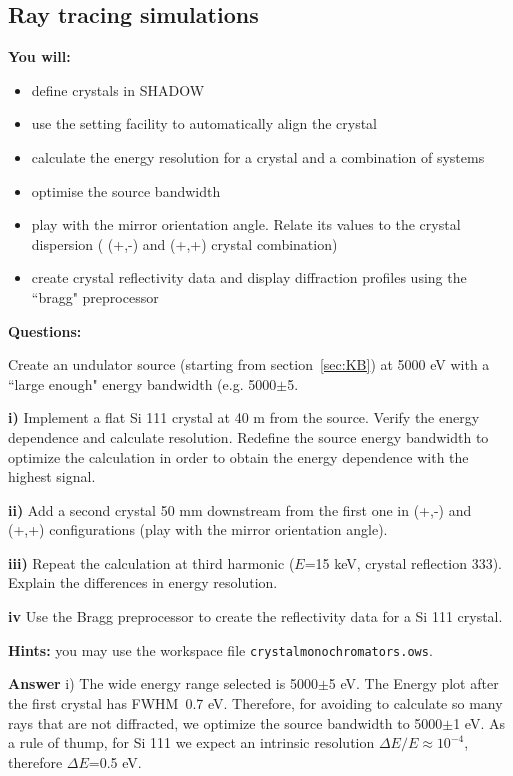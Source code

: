 \subsection{Ray tracing simulations}

\textbf{You will:}

\begin{itemize}
    \item define crystals in SHADOW
    \item use the setting facility to automatically align the crystal
    \item calculate the energy resolution for a crystal and a combination of systems
    \item optimise the source bandwidth
    \item play with the mirror orientation angle. Relate its values to the crystal dispersion ( (+,-) and (+,+) crystal combination)
    \item create crystal reflectivity data and display diffraction profiles using the ``bragg" preprocessor
\end{itemize}

\textbf{Questions:}

Create an undulator source (starting from section~\ref{sec:KB}) at 5000 eV with a ``large enough" energy bandwidth (e.g. 5000$\pm$5.

\textbf{i)} Implement a flat Si 111 crystal at 40 m from the source. Verify the energy dependence and calculate resolution. Redefine the source energy bandwidth to optimize the calculation in order to obtain the energy dependence with the highest signal. 

\textbf{ii)} Add a second crystal 50 mm downstream from the first one in (+,-) and (+,+) configurations (play with the mirror orientation angle). 

\textbf{iii)} Repeat the calculation at third harmonic ($E$=15 keV, crystal reflection 333). Explain the differences in energy resolution.

\textbf{iv} Use the Bragg preprocessor to create the reflectivity data for a Si 111 crystal.

\textbf{Hints:} you may use the workspace file {\tt crystalmonochromators.ows}. 




\textbf{Answer}
i) The wide energy range selected is 5000$\pm$5 eV. The Energy plot after the first crystal has FWHM~0.7 eV. Therefore, for avoiding to calculate so many rays that are not diffracted, we optimize the source bandwidth to 5000$\pm$1 eV. As a rule of thump, for Si 111 we expect an intrinsic resolution $\Delta E/E \approx 10^{-4}$, therefore $\Delta E$=0.5 eV.


